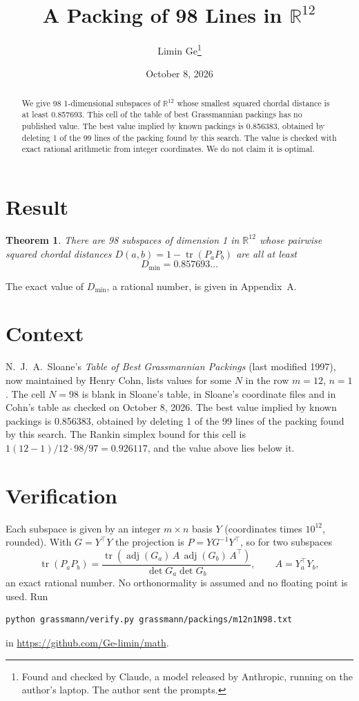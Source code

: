 \documentclass[11pt,a4paper]{article}
\title{A Packing of 98 Lines in $\mathbb{R}^{12}$}
\author{Limin Ge\thanks{Found and checked by Claude, a model released by Anthropic, running on the author's laptop. The author sent the prompts.}}
\date{October 8, 2026}
\newtheorem*{theorem}{Theorem}
\begin{document}
\maketitle
\begin{abstract}
We give 98 1-dimensional subspaces of $\mathbb{R}^{12}$ whose smallest squared chordal distance is at least 0.857693. This cell of the table of best Grassmannian packings has no published value. The best value implied by known packings is 0.856383, obtained by deleting 1 of the 99 lines of the packing found by this search. The value is checked with exact rational arithmetic from integer coordinates. We do not claim it is optimal.
\end{abstract}

\section{Result}
\begin{theorem}
There are 98 subspaces of dimension 1 in $\mathbb{R}^{12}$ whose pairwise squared chordal distances $D(a,b) = 1 - \operatorname{tr}(P_aP_b)$ are all at least
\[ D_{\min} = 0.857693\ldots \]
\end{theorem}
The exact value of $D_{\min}$, a rational number, is given in Appendix~A.


\section{Context}
N.~J.~A.~Sloane's \emph{Table of Best Grassmannian Packings} (last modified 1997), now maintained by Henry Cohn, lists values for some $N$ in the row $m=12$, $n=1$. The cell $N=98$ is blank in Sloane's table, in Sloane's coordinate files and in Cohn's table as checked on October 8, 2026. The best value implied by known packings is 0.856383, obtained by deleting 1 of the 99 lines of the packing found by this search. The Rankin simplex bound for this cell is $1(12-1)/12\cdot 98/97 = 0.926117$, and the value above lies below it.


\section{Verification}
Each subspace is given by an integer $m\times n$ basis $Y$ (coordinates times $10^{12}$, rounded). With $G=Y^\top Y$ the projection is $P=YG^{-1}Y^\top$, so for two subspaces
\[ \operatorname{tr}(P_aP_b)=\frac{\operatorname{tr}(\operatorname{adj}(G_a)\,A\,\operatorname{adj}(G_b)\,A^\top)}{\det G_a\det G_b},\qquad A=Y_a^\top Y_b, \]
an exact rational number. No orthonormality is assumed and no floating point is used. Run
\begin{verbatim}
python grassmann/verify.py grassmann/packings/m12n1N98.txt
\end{verbatim}
in \url{https://github.com/Ge-limin/math}.
\end{document}

